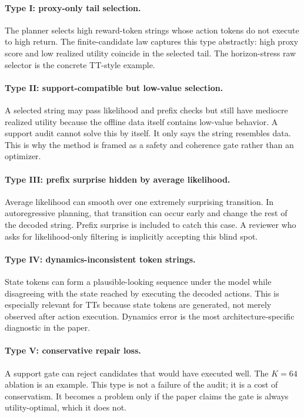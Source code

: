 \documentclass{article}
\begin{document}
\paragraph{Type I: proxy-only tail selection.}
The planner selects high reward-token strings whose action tokens do not execute to high return. The finite-candidate law captures this type abstractly: high proxy score and low realized utility coincide in the selected tail. The horizon-stress raw selector is the concrete TT-style example.

\paragraph{Type II: support-compatible but low-value selection.}
A selected string may pass likelihood and prefix checks but still have mediocre realized utility because the offline data itself contains low-value behavior. A support audit cannot solve this by itself. It only says the string resembles data. This is why the method is framed as a safety and coherence gate rather than an optimizer.

\paragraph{Type III: prefix surprise hidden by average likelihood.}
Average likelihood can smooth over one extremely surprising transition. In autoregressive planning, that transition can occur early and change the rest of the decoded string. Prefix surprise is included to catch this case. A reviewer who asks for likelihood-only filtering is implicitly accepting this blind spot.

\paragraph{Type IV: dynamics-inconsistent token strings.}
State tokens can form a plausible-looking sequence under the model while disagreeing with the state reached by executing the decoded actions. This is especially relevant for TTs because state tokens are generated, not merely observed after action execution. Dynamics error is the most architecture-specific diagnostic in the paper.

\paragraph{Type V: conservative repair loss.}
A support gate can reject candidates that would have executed well. The \(K=64\) ablation is an example. This type is not a failure of the audit; it is a cost of conservatism. It becomes a problem only if the paper claims the gate is always utility-optimal, which it does not.
\end{document}
